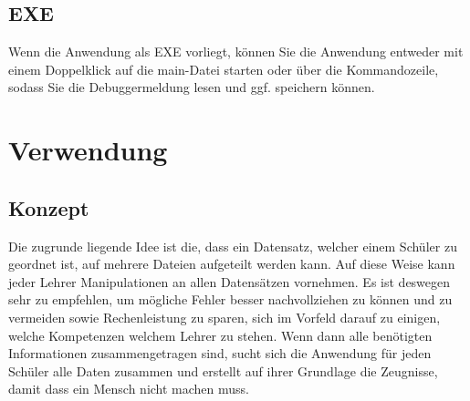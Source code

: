 \documentclass[a4paper,10pt]{scrartcl}
\begin{document}
   \subsection{EXE}
      Wenn die Anwendung als EXE vorliegt, können Sie die Anwendung entweder mit einem Doppelklick auf die main-Datei starten oder über die Kommandozeile, sodass Sie die Debuggermeldung lesen und ggf. speichern können.

\section{Verwendung}
   \subsection{Konzept}
     Die zugrunde liegende Idee ist die, dass ein Datensatz, welcher einem Schüler zu geordnet ist, auf mehrere Dateien aufgeteilt werden kann. Auf diese Weise kann jeder Lehrer Manipulationen an allen Datensätzen vornehmen. Es ist deswegen sehr zu empfehlen, um mögliche Fehler besser nachvollziehen zu können und zu vermeiden sowie Rechenleistung zu sparen, sich im Vorfeld darauf zu einigen, welche Kompetenzen welchem Lehrer zu stehen. \newline
     Wenn dann alle benötigten Informationen zusammengetragen sind, sucht sich die Anwendung für jeden Schüler alle Daten zusammen und erstellt auf ihrer Grundlage die Zeugnisse, damit dass ein Mensch nicht machen muss.
\end{document}

